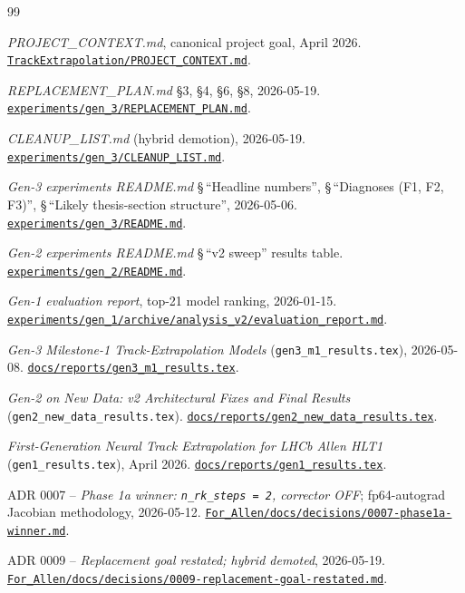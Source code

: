 \documentclass[11pt,a4paper]{article}
\begin{document}
\begin{thebibliography}{99}\small

\emph{PROJECT\_CONTEXT.md}, canonical project goal, April 2026.
\href{run:../../PROJECT_CONTEXT.md}{\texttt{TrackExtrapolation/PROJECT\_CONTEXT.md}}.

\emph{REPLACEMENT\_PLAN.md} \S 3, \S 4, \S 6, \S 8, 2026-05-19.
\href{run:../../experiments/gen_3/REPLACEMENT_PLAN.md}{\texttt{experiments/gen\_3/REPLACEMENT\_PLAN.md}}.

\emph{CLEANUP\_LIST.md} (hybrid demotion), 2026-05-19.
\href{run:../../experiments/gen_3/CLEANUP_LIST.md}{\texttt{experiments/gen\_3/CLEANUP\_LIST.md}}.

\emph{Gen-3 experiments README.md} \S\,``Headline numbers'',
\S\,``Diagnoses (F1, F2, F3)'', \S\,``Likely thesis-section
structure'', 2026-05-06.
\href{run:../../experiments/gen_3/README.md}{\texttt{experiments/gen\_3/README.md}}.

\emph{Gen-2 experiments README.md} \S\,``v2 sweep'' results table.
\href{run:../../experiments/gen_2/README.md}{\texttt{experiments/gen\_2/README.md}}.

\emph{Gen-1 evaluation report}, top-21 model ranking, 2026-01-15.
\href{run:../../experiments/gen_1/archive/analysis_v2/evaluation_report.md}{\texttt{experiments/gen\_1/archive/analysis\_v2/evaluation\_report.md}}.

\emph{Gen-3 Milestone-1 Track-Extrapolation Models}
(\texttt{gen3\_m1\_results.tex}), 2026-05-08.
\href{run:gen3_m1_results.tex}{\texttt{docs/reports/gen3\_m1\_results.tex}}.

\emph{Gen-2 on New Data: v2 Architectural Fixes and Final Results}
(\texttt{gen2\_new\_data\_results.tex}).
\href{run:gen2_new_data_results.tex}{\texttt{docs/reports/gen2\_new\_data\_results.tex}}.

\emph{First-Generation Neural Track Extrapolation for LHCb Allen HLT1}
(\texttt{gen1\_results.tex}), April 2026.
\href{run:gen1_results.tex}{\texttt{docs/reports/gen1\_results.tex}}.

ADR 0007 -- \emph{Phase 1a winner: \texttt{n\_rk\_steps = 2},
corrector OFF}; fp64-autograd Jacobian methodology, 2026-05-12.
\href{run:../../experiments/gen_3/For_Allen/docs/decisions/0007-phase1a-winner.md}{\texttt{For\_Allen/docs/decisions/0007-phase1a-winner.md}}.

ADR 0009 -- \emph{Replacement goal restated; hybrid demoted},
2026-05-19.
\href{run:../../experiments/gen_3/For_Allen/docs/decisions/0009-replacement-goal-restated.md}{\texttt{For\_Allen/docs/decisions/0009-replacement-goal-restated.md}}.

\end{thebibliography}
\end{document}
